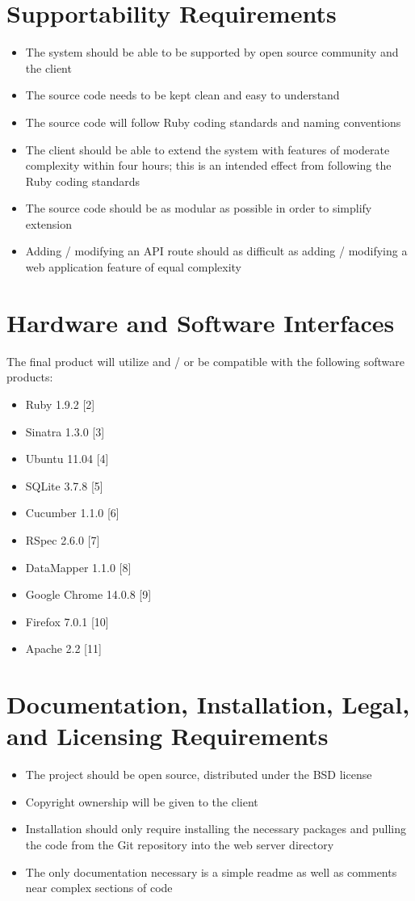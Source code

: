 \documentclass{article}
\begin{document}
\section{Supportability Requirements}
\label{support}
\begin{itemize}
\item The system should be able to be supported by open source community and the client
\item The source code needs to be kept clean and easy to understand
\item The source code will follow Ruby coding standards and naming conventions
\item The client should be able to extend the system with features of moderate complexity within four hours; this is an intended effect from following the Ruby coding standards
\item The source code should be as modular as possible in order to simplify extension
\item Adding / modifying an API route should as difficult as adding / modifying a web application feature of equal complexity
\end{itemize}

\section{Hardware and Software Interfaces}
The final product will utilize and / or be compatible with the following software products:\\
\begin{itemize}
\item Ruby 1.9.2 [2]
\item Sinatra 1.3.0 [3]
\item Ubuntu 11.04 [4]
\item SQLite 3.7.8 [5]
\item Cucumber 1.1.0 [6]
\item RSpec 2.6.0 [7]
\item DataMapper 1.1.0 [8]
\item Google Chrome 14.0.8 [9]
\item Firefox 7.0.1 [10]
\item Apache 2.2 [11]
\end{itemize}

\section{Documentation, Installation, Legal, and Licensing Requirements}
\begin{itemize}
\item The project should be open source, distributed under the BSD license
\item Copyright ownership will be given to the client
\item Installation should only require installing the necessary packages and pulling the code from the Git repository into the web server directory
\item The only documentation necessary is a simple readme as well as comments near complex sections of code
\end{itemize}
\end{document}
